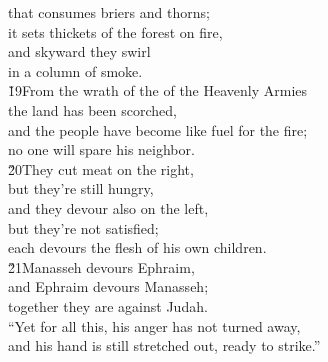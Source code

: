 \begin{poetry}
\poemll    that consumes briers and thorns; \\
\poeml it sets thickets of the forest on fire, \\
\poemll    and skyward they swirl \\
\poemlll       in a column of smoke. \\
\poeml \v{19}From the wrath of the  of the Heavenly Armies \\
\poemll    the land has been scorched, \\
\poeml and the people have become like fuel for the fire; \\
\poemlll       no one will spare his neighbor. \\
\poeml \v{20}They cut meat on the right, \\
\poemll    but they're still hungry, \\
\poeml and they devour also on the left, \\
\poemll    but they're not satisfied; \\
\poemlll       each devours the flesh of his own children. \\
\poeml \v{21}Manasseh devours Ephraim, \\
\poemll    and Ephraim devours Manasseh; \\
\poeml together they are against Judah. \\
\poeml ``Yet for all this, his anger has not turned away, \\
\poemll    and his hand is still stretched out, ready to strike.''
\end{poetry}

